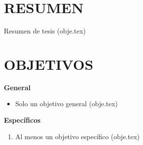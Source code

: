 \chapter{RESUMEN}

Resumen de tesis (obje.tex)


\chapter{OBJETIVOS}

{\Large \textbf{General}} \label{objetivog}
\begin{itemize}
    \item Solo un objetivo general (obje.tex)
\end{itemize}

\vspace{18pt}

{\Large \textbf{Específicos}}

\begin{enumerate}
    \item Al menos un objetivo específico (obje.tex)
\end{enumerate}
